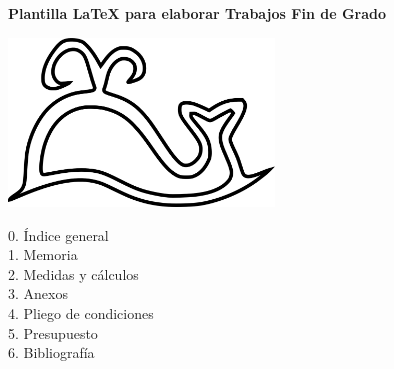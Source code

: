 %

\AddToShipoutPicture*{\chapterback}
\begin{titlepage}
\thispagestyle{empty}
\vspace*{1em}
\begin{minipage}{\textwidth}\end{minipage}

\begin{center}
\vspace*{25pt}

\begin{minipage}{.8\textwidth}
\centering
\LARGE
{\bfseries Plantilla \LaTeX{} para elaborar Trabajos Fin de Grado}

\vspace*{25pt}
\includegraphics[width=200pt]{./images/logo.png}
\end{minipage}

\vspace{25pt}
\hspace{3em}
\begin{minipage}{.425\textwidth}
\LARGE
0. Índice general\\
1. Memoria\\
2. Medidas y cálculos\\
3. Anexos\\
4. Pliego de condiciones\\
5. Presupuesto\\
6. Bibliografía\\
\end{minipage}
\end{center}

\begin{minipage}{\textwidth}\end{minipage}
\end{titlepage}
\clearpage
